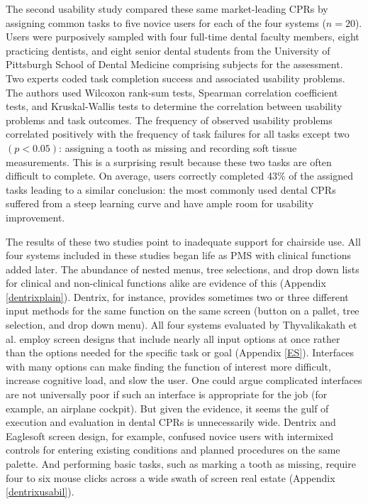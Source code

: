 \documentclass[11pt]{article}
\begin{document}
The second usability study compared\cite{Nielsen1994Enhancing-the-e} these same market-leading CPRs by assigning common tasks to five novice users for each of the four systems ($n = 20$). Users were purposively sampled with four full-time dental faculty members, eight practicing dentists, and eight senior dental students from the University of Pittsburgh School of Dental Medicine comprising subjects for the assessment. Two experts coded task completion success and associated usability problems. The authors used Wilcoxon rank-sum tests, Spearman correlation coefficient tests, and Kruskal-Wallis tests to determine the correlation between usability problems and task outcomes. The frequency of observed usability problems correlated positively with the frequency of task failures for all tasks except two $(p < 0.05)$: assigning a tooth as missing and recording soft tissue measurements. This is a surprising result because these two tasks are often difficult to complete. On average, users correctly completed 43\% of the assigned tasks leading to a similar conclusion: the most commonly used dental CPRs suffered from a steep learning curve and have ample room for usability improvement.

The results of these two studies point to inadequate support for chairside use. All four systems included in these studies began life as PMS with clinical functions added later. The abundance of nested menus, tree selections, and drop down lists for clinical and non-clinical functions alike are evidence of this (Appendix \ref{dentrixplain}). Dentrix, for instance, provides sometimes two or three different input methods for the same function on the same screen (button on a pallet, tree selection, and drop down menu). All four systems evaluated by Thyvalikakath et al. employ screen designs that include nearly all input options at once rather than the options needed for the specific task or goal (Appendix \ref{ES}). Interfaces with many options can make finding the function of interest more difficult, increase cognitive load, and slow the user\cite{Qian2011Towards-develop}. One could argue complicated interfaces are not universally poor if such an interface is appropriate for the job (for example, an airplane cockpit). But given the evidence, it seems the gulf of execution and evaluation \cite{Norman:1989uq} in dental CPRs is unnecessarily wide. Dentrix and Eaglesoft screen design, for example, confused novice users with intermixed controls for entering existing conditions and planned procedures on the same palette. And performing basic tasks, such as marking a tooth as missing, require four to six mouse clicks across a wide swath of screen real estate (Appendix \ref{dentrixusabil}). 
\end{document}
